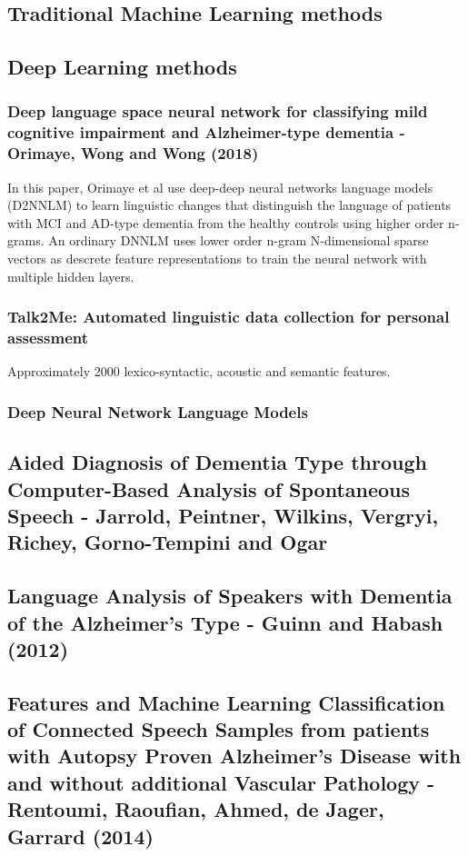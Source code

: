 \documentclass[12pt]{article}
\begin{document}
\subsection{Traditional Machine Learning methods}
\subsection{Deep Learning methods}
\subsubsection{Deep language space neural network for classifying mild cognitive impairment and Alzheimer-type dementia - Orimaye, Wong and Wong (2018)}
In this paper, Orimaye et al use deep-deep neural networks language models (D2NNLM) to learn linguistic changes that distinguish the language of patients with MCI and AD-type dementia from the healthy controls using higher order n-grams. An ordinary DNNLM uses lower order n-gram N-dimensional sparse vectors as descrete feature representations to train the neural network with multiple hidden layers.

\subsubsection{Talk2Me: Automated linguistic data collection for personal assessment}
Approximately 2000 lexico-syntactic, acoustic and semantic features.
\subsubsection{Deep Neural Network Language Models}


\subsection{Aided Diagnosis of Dementia Type through Computer-Based Analysis of Spontaneous Speech - Jarrold, Peintner, Wilkins, Vergryi, Richey, Gorno-Tempini and Ogar}



\subsection{Language Analysis of Speakers with Dementia of the Alzheimer's Type - Guinn and Habash (2012)}

\subsection{Features and Machine Learning Classification of Connected Speech Samples from patients with Autopsy Proven Alzheimer's Disease with and without additional Vascular Pathology - Rentoumi, Raoufian, Ahmed, de Jager, Garrard (2014)}
\end{document}
